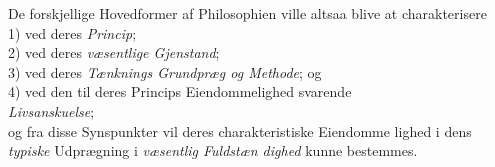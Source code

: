 De forskjellige Hovedformer af Philosophien ville altsaa
blive at charakterisere\\
\hspace*{1em}1) ved deres \emph{Princip};\\
\hspace*{1em}2) ved deres \emph{væsentlige Gjenstand};\\
\hspace*{1em}3) ved deres \emph{Tænknings Grundpræg og Methode}; og\\
\hspace*{1em}4) ved den til deres Princips Eiendommelighed svarende\\
\hspace*{\parindent}\emph{Livsanskuelse};\\
og fra disse Synspunkter vil deres charakteristiske Eiendomme\-%
lighed i dens \emph{typiske} Udprægning i \emph{væsentlig Fuldstæn\-%
dighed} kunne bestemmes.

\divrule

